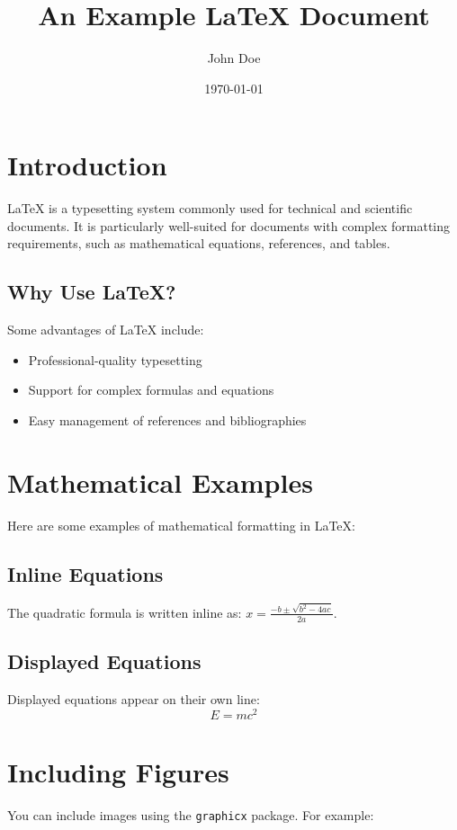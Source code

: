 \documentclass[a4paper,12pt]{article} %
\title{An Example LaTeX Document}
\author{John Doe}
\date{\today}
\begin{document}
\maketitle %

\tableofcontents %

\section{Introduction}
LaTeX is a typesetting system commonly used for technical and scientific documents. It is particularly well-suited for documents with complex formatting requirements, such as mathematical equations, references, and tables.

\subsection{Why Use LaTeX?}
Some advantages of LaTeX include:
\begin{itemize}
    \item Professional-quality typesetting
    \item Support for complex formulas and equations
    \item Easy management of references and bibliographies
\end{itemize}

\section{Mathematical Examples}
Here are some examples of mathematical formatting in LaTeX:
\subsection{Inline Equations}
The quadratic formula is written inline as: \( x = \frac{-b \pm \sqrt{b^2 - 4ac}}{2a} \).

\subsection{Displayed Equations}
Displayed equations appear on their own line:
\[
E = mc^2
\]

\section{Including Figures}
You can include images using the \texttt{graphicx} package. For example:
\end{document}
